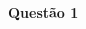 \documentclass[oneside,12pt]{article}
\begin{document}
\newpage


\def\barra {\scalebox{0.4}{$\ga{barranco}$}}
\def\barral{\ga{barranco com linhas}}

$\begin{matrix}
 \barra & \barra & \barra \\ \\
 \barra & \barra & \barra \\
 \end{matrix}
$







\newpage


{\bf Questão 1}
\end{document}
